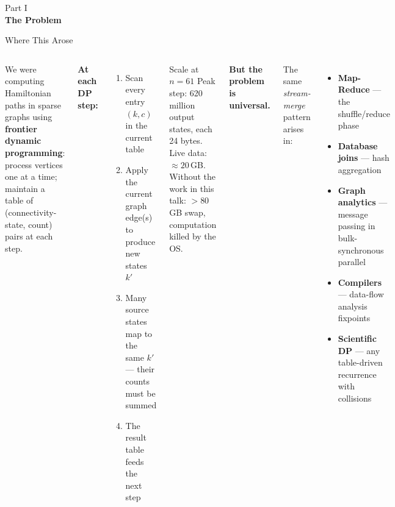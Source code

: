 \documentclass[aspectratio=169,t]{beamer}
\begin{document}
{
\begin{frame}[plain]
  \vspace{2cm}
  \begin{center}
    {\color{lightblue}\small Part I}\\[0.4cm]
    {\color{white}\LARGE\bfseries The Problem}
  \end{center}
\end{frame}
}

\begin{frame}{Where This Arose}
\begin{columns}[c]
We were computing Hamiltonian paths in sparse graphs
using \textbf{frontier dynamic programming}: process
vertices one at a time; maintain a table of
(connectivity-state, count) pairs at each step.

\vspace{0.2cm}
\textbf{At each DP step:}
\begin{enumerate}
  \item Scan every entry $(k, c)$ in the current table
  \item Apply the current graph edge(s) to produce new states $k'$
  \item \alert{Many source states map to the same $k'$} — their counts must be summed
  \item The result table feeds the next step
\end{enumerate}

\vspace{0.2cm}
\begin{block}{Scale at $n=61$}
  Peak step: 620 million output states, each 24 bytes.\\
  Live data: $\approx 20$\,GB. Without the work in this talk:
  $>80$\,GB swap, computation killed by the OS.
\end{block}

\textbf{But the problem is universal.}

\vspace{0.2cm}
The same \emph{stream-merge} pattern arises in:
\begin{itemize}
  \item \textbf{Map-Reduce} — the shuffle/reduce phase
  \item \textbf{Database joins} — hash aggregation
  \item \textbf{Graph analytics} — message passing in bulk-synchronous parallel
  \item \textbf{Compilers} — data-flow analysis fixpoints
  \item \textbf{Scientific DP} — any table-driven recurrence with collisions
\end{itemize}


\end{columns}
\end{frame}
\end{document}
